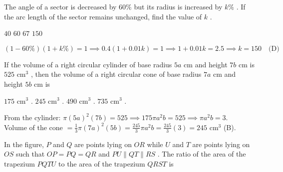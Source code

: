 
\question The angle of a sector is decreased by $60\%$ but its radius is increased by $k\%$ . If the arc length of the sector remains unchanged, find the value of $k$ .
\begin{choices}
    \choice $40$
    \choice $60$
    \choice $67$
    \correctchoice $150$
\end{choices}
\begin{solution}
\[ (1 - 60\%)(1 + k\%) = 1 \implies 0.4(1 + 0.01k) = 1 \implies 1 + 0.01k = 2.5 \implies k = 150 \quad \text{(D)} \]
\end{solution}

\question If the volume of a right circular cylinder of base radius $5a\text{ cm}$ and height $7b\text{ cm}$ is $525\text{ cm}^3$ , then the volume of a right circular cone of base radius $7a\text{ cm}$ and height $5b\text{ cm}$ is
\begin{choices}
    \choice $175\text{ cm}^3$ .
    \correctchoice $245\text{ cm}^3$ .
    \choice $490\text{ cm}^3$ .
    \choice $735\text{ cm}^3$ .
\end{choices}
\begin{solution}
From the cylinder: $\pi(5a)^2(7b) = 525 \implies 175\pi a^2b = 525 \implies \pi a^2b = 3$. \\
Volume of the cone $= \frac{1}{3}\pi(7a)^2(5b) = \frac{245}{3}\pi a^2b = \frac{245}{3}(3) = 245\text{ cm}^3$ (B).
\end{solution}

\question In the figure, $P$ and $Q$ are points lying on $OR$ while $U$ and $T$ are points lying on $OS$ such that $OP = PQ = QR$ and $PU \parallel QT \parallel RS$ . The ratio of the area of the trapezium $PQTU$ to the area of the trapezium $QRST$ is

